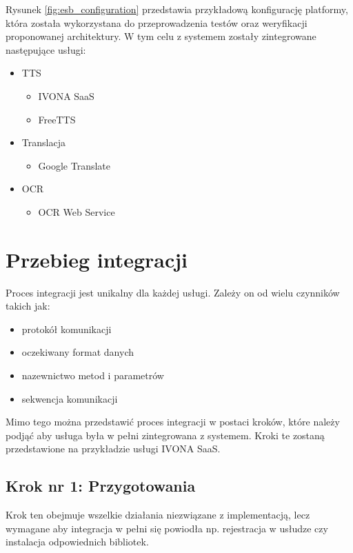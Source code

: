 Rysunek \ref{fig:esb_configuration} przedstawia przykładową konfigurację platformy, która została wykorzystana do przeprowadzenia testów oraz weryfikacji proponowanej architektury. W tym celu z systemem zostały zintegrowane następujące usługi:

\begin{itemize}
	\item TTS
	\begin{itemize}
		\item IVONA SaaS
		\item FreeTTS
	\end{itemize}
	\item Translacja
	\begin{itemize}
		\item Google Translate
	\end{itemize}
	\item OCR
	\begin{itemize}
		\item OCR Web Service
	\end{itemize}
\end{itemize}

\section {Przebieg integracji}

Proces integracji jest unikalny dla każdej usługi. Zależy on od wielu czynników takich jak:

\begin{itemize}
	\item protokół komunikacji
	\item oczekiwany format danych
	\item nazewnictwo metod i parametrów
	\item sekwencja komunikacji
\end{itemize}

Mimo tego można przedstawić proces integracji w postaci kroków, które należy podjąć aby usługa była w pełni zintegrowana z systemem. Kroki te zostaną przedstawione na przykładzie usługi IVONA SaaS.

\subsection {Krok nr 1: Przygotowania}
Krok ten obejmuje wszelkie działania niezwiązane z implementacją, lecz wymagane aby integracja w pełni się powiodła np. rejestracja w usłudze czy instalacja odpowiednich bibliotek.

